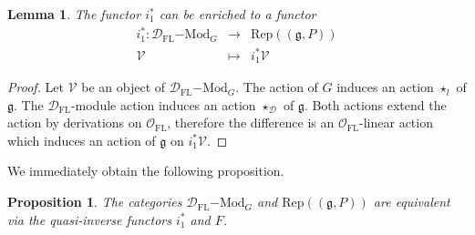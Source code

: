 \documentclass[10pt, oneside]{amsart}
\numberwithin{equation}{subsection}
\newtheorem{proposition}[equation]{Proposition}
\newtheorem{lemma}[equation]{Lemma}
\theoremstyle{definition}
\theoremstyle{remark}
\newcommand{\opn}[1]{\operatorname{#1}}
\begin{document}
\begin{lemma} 
The functor  $i_1^{*}$ can be enriched to a functor 
\begin{eqnarray*}
i_1^* \colon \mathcal{D}_{\opn{FL}}\mathrm{-Mod}_G & \rightarrow & \mathrm{Rep}((\mathfrak{g},P))\\
\mathcal{V} & \mapsto & i_1^* \mathcal{V}
\end{eqnarray*}
\end{lemma}
\begin{proof} Let $\mathcal{V}$ be an object of $\mathcal{D}_{\opn{FL}}\mathrm{-Mod}_G$. The action of $G$ induces an action $\star_l$ of $\mathfrak{g}$. The $\mathcal{D}_{\opn{FL}}$-module action induces an action $\star_{\mathcal{D}}$ of $\mathfrak{g}$. Both actions extend the action by derivations on $\mathcal{O}_{\opn{FL}}$, therefore the difference is an $\mathcal{O}_{\opn{FL}}$-linear action which induces an action of $\mathfrak{g}$ on $i_1^* \mathcal{V}$.
\end{proof}

We immediately obtain the following proposition.

\begin{proposition} 
The categories $\mathcal{D}_{\opn{FL}}\mathrm{-Mod}_G$ and $\mathrm{Rep}((\mathfrak{g},P))$ are equivalent via the quasi-inverse functors $i_1^*$ and $F$.
\end{proposition}
\end{document}
